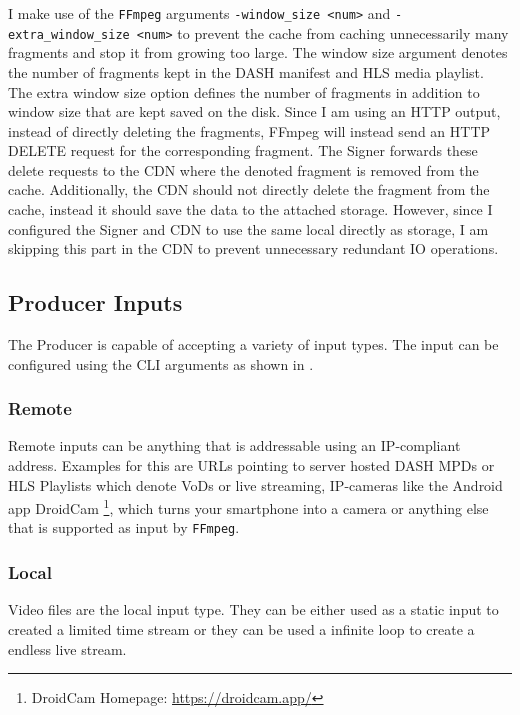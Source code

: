 I make use of the \texttt{FFmpeg} arguments \texttt{-window\_size <num>} and \texttt{-extra\_window\_size <num>} to prevent the cache from caching unnecessarily many fragments and stop it from growing too large. The window size argument denotes the number of fragments kept in the DASH manifest and HLS media playlist. The extra window size option defines the number of fragments in addition to window size that are kept saved on the disk. Since I am using an HTTP output, instead of directly deleting the fragments, FFmpeg will instead send an HTTP DELETE request for the corresponding fragment. The Signer forwards these delete requests to the CDN where the denoted fragment is removed from the cache. Additionally, the CDN should not directly delete the fragment from the cache, instead it should save the data to the attached storage. However, since I configured the Signer and CDN to use the same local directly as storage, I am skipping this part in the CDN to prevent unnecessary redundant IO operations.

\subsection{Producer Inputs\label{sec:producer_inputs}}

The Producer is capable of accepting a variety of input types. The input can be configured using the CLI arguments as shown in .

\subsubsection{Remote}

Remote inputs can be anything that is addressable using an IP-compliant address. Examples for this are URLs pointing to server hosted DASH MPDs or HLS Playlists which denote VoDs or live streaming, IP-cameras like the Android app DroidCam \footnote{DroidCam Homepage: \url{https://droidcam.app/}}, which turns your smartphone into a camera or anything else that is supported as input by \texttt{FFmpeg}.

\subsubsection{Local}

Video files are the local input type. They can be either used as a static input to created a limited time stream or they can be used a infinite loop to create a endless live stream.

